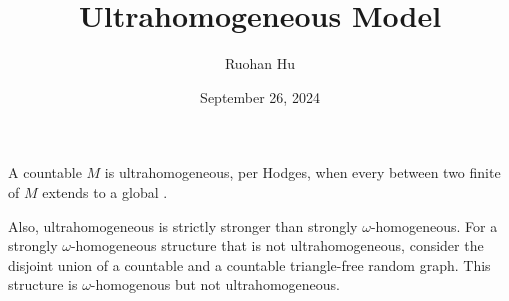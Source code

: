 \documentclass[a4paper]{article}
\title{Ultrahomogeneous Model}
\date{September 26, 2024}
\author{Ruohan Hu}
\begin{document}
\maketitle
\par{
    A countable  \(M\) is ultrahomogeneous, per Hodges, when every  between two finite  of \(M\) extends to a global .

    Also, ultrahomogeneous is strictly stronger than strongly \(\omega\)-homogeneous. For a strongly \(\omega\)-homogeneous structure that is not ultrahomogeneous, consider the disjoint union of a countable  and a countable triangle-free random graph. This structure is \(\omega\)-homogenous but not ultrahomogeneous.
}
\printbibliography
\end{document}
